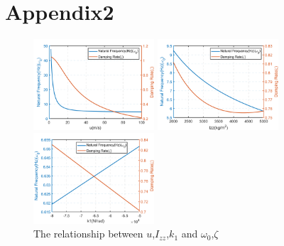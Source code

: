 \documentclass[UTF8,a4paper,11pt]{article}
\begin{document}
\section{Appendix2}
\begin{figure}[h]
	\begin{minipage}{4.5cm}
		\centering
		\includegraphics[width=4.5cm]{./figures/figu-nf-dr.png}
		\caption{}
	\end{minipage}
	\begin{minipage}{4.5cm}        %
		\hspace{2mm}
		\includegraphics[width=4.5cm]{./figures/figI-nf-dr.png}
		\caption{}
	\end{minipage}
	\begin{minipage}{4.5cm}
	\centering
	\includegraphics[width=4.5cm]{./figures/figk1-nf-dr.png}
	\caption{}
\end{minipage}
\caption{The relationship between $u$,$I_{zz}$,$k_1$ and $\omega_0$,$\zeta$}
\end{figure}
\end{document}
